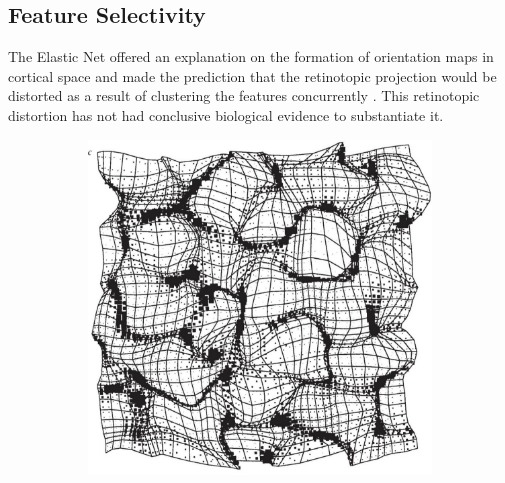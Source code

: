 \subsection{Feature Selectivity}
The Elastic Net offered an explanation on the formation of orientation maps in cortical space and made the prediction that the retinotopic projection would be distorted as a result of clustering the features concurrently \cite{Durbin1990-tn}. This retinotopic distortion has not had conclusive biological evidence to substantiate it. 
\begin{figure}
	\begin{subfigure}{0.5\textwidth}
		\centering
		\includegraphics[width=\textwidth]{images/introduction/distortedretinotopy}
		\caption{}
	\end{subfigure}
	\begin{subfigure}{0.4\textwidth}
		\centering

\end{subfigure}
\end{figure}
